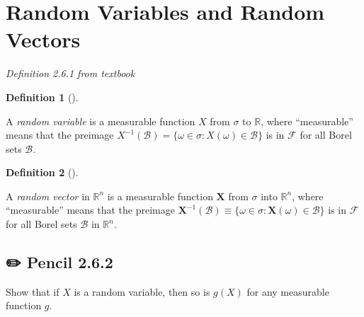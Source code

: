 \documentclass[
  letterpaper,
  DIV=11,
  numbers=noendperiod]{scrreprt}
\theoremstyle{plain}
\theoremstyle{definition}
\newtheorem{definition}{Definition}[chapter]
\theoremstyle{remark}
\begin{document}
\hypertarget{random-variables-and-random-vectors}{%
\section*{Random Variables and Random
Vectors}\label{random-variables-and-random-vectors}}


\emph{Definition 2.6.1 from textbook}

\leavevmode{}%
\begin{definition}[]\label{def-random-variable}

A \emph{random variable} is a measurable function \(X\) from \(\sigma\)
to \(\mathbb{R}\), where ``measurable'' means that the preimage
\(X^{-1}(\mathcal{B}) = \{\omega \in \sigma : X(\omega) \in \mathcal{B}\}\)
is in \(\mathcal{F}\) for all Borel sets \(\mathcal{B}\).

\end{definition}

\leavevmode{}%
\begin{definition}[]\label{def-random-vector}

A \emph{random vector} in \(\mathbb{R}^n\) is a measurable function
\(\mathbf{X}\) from \(\sigma\) into \(\mathbb{R}^n\), where
``measurable'' means that the preimage
\(\mathbf{X}^{-1} (\mathcal{B}) \equiv \{\omega \in \sigma: \mathbf{X}(\omega) \in \mathcal{B}\}\)
is in \(\mathcal{F}\) for all Borel sets \(\mathcal{B}\) in
\(\mathbb{R}^n\).

\end{definition}

\hypertarget{pencil-2.6.2}{%
\subsection*{✏️ Pencil 2.6.2}\label{pencil-2.6.2}}

Show that if \(X\) is a random variable, then so is \(g(X)\) for any
measurable function \(g\).
\end{document}

